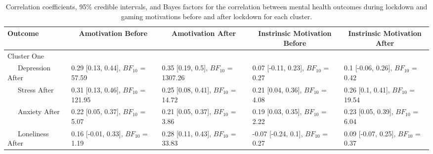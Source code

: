 \documentclass[
  english,
  jou,floatsintext]{apa6}
\begin{document}
\begin{table*}[tbp]

\begin{center}
\begin{threeparttable}

\caption{\label{tab:cluster-motivation-correlations}Correlation coefficients, 95\% credible intervals, and Bayes factors for the correlation between mental health outcomes during lockdown and gaming motivations before and after lockdown for each cluster.}

\begin{tabular}{lllll}
\toprule
Outcome & \multicolumn{1}{c}{Amotivation Before} & \multicolumn{1}{c}{Amotivation After} & \multicolumn{1}{c}{Instrinsic Motivation Before} & \multicolumn{1}{c}{Instrinsic Motivation After}\\
\midrule
Cluster One &  &  &  & \\
\ \ \ Depression After & \makecell[c]{0.29 [0.13, 0.44], \\$BF_{10}$ = 57.59} & \makecell[c]{0.35 [0.19, 0.5], \\$BF_{10}$ = 1307.26} & \makecell[c]{0.07 [-0.11, 0.23], \\$BF_{10}$ = 0.27} & \makecell[c]{0.1 [-0.06, 0.26], \\$BF_{10}$ = 0.42}\\
\ \ \ Stress After & \makecell[c]{0.31 [0.13, 0.46], \\$BF_{10}$ = 121.95} & \makecell[c]{0.25 [0.08, 0.41], \\$BF_{10}$ = 14.72} & \makecell[c]{0.21 [0.04, 0.36], \\$BF_{10}$ = 4.08} & \makecell[c]{0.26 [0.1, 0.41], \\$BF_{10}$ = 19.54}\\
\ \ \ Anxiety After & \makecell[c]{0.22 [0.05, 0.37], \\$BF_{10}$ = 5.07} & \makecell[c]{0.21 [0.05, 0.37], \\$BF_{10}$ = 3.86} & \makecell[c]{0.19 [0.03, 0.35], \\$BF_{10}$ = 2.22} & \makecell[c]{0.23 [0.05, 0.39], \\$BF_{10}$ = 6.04}\\
\ \ \ Loneliness After & \makecell[c]{0.16 [-0.01, 0.33], \\$BF_{10}$ = 1.19} & \makecell[c]{0.28 [0.11, 0.43], \\$BF_{10}$ = 33.83} & \makecell[c]{-0.07 [-0.24, 0.1], \\$BF_{10}$ = 0.27} & \makecell[c]{0.09 [-0.07, 0.25], \\$BF_{10}$ = 0.37}\\

\end{tabular}
\end{threeparttable}
\end{center}
\end{table*}
\end{document}
